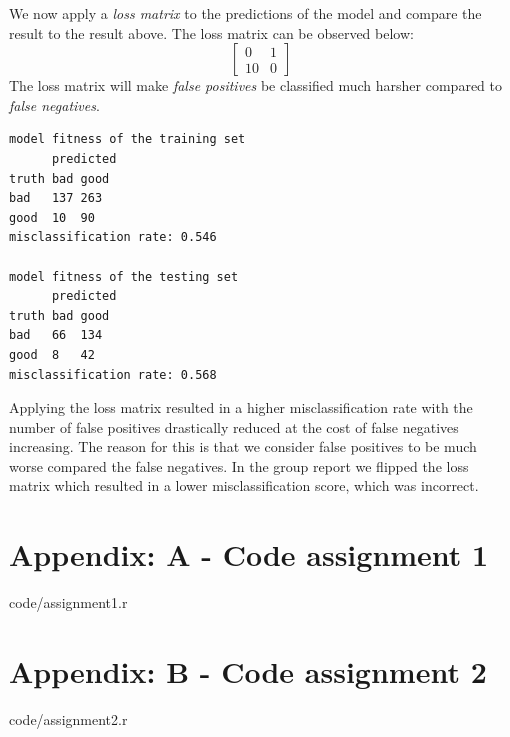 \documentclass[a4paper,12pt]{article}
\begin{document}
We now apply a \textit{loss matrix} to the predictions of the model and compare the result to the result above. The loss matrix can be observed below:
\begin{equation}
  \begin{bmatrix}
  0 & 1\\ 
  10 & 0
  \end{bmatrix}
\end{equation}
The loss matrix will make \textit{false positives} be classified much harsher compared to \textit{false negatives}.

\begin{verbatim}
model fitness of the training set
      predicted
truth bad good
bad   137 263
good  10  90
misclassification rate: 0.546

model fitness of the testing set
      predicted
truth bad good
bad   66  134
good  8   42
misclassification rate: 0.568
\end{verbatim}
Applying the loss matrix resulted in a higher misclassification rate with the number of false positives drastically reduced at the cost of false negatives increasing. The reason for this is that we consider false positives to be much worse compared the false negatives. In the group report we flipped the loss matrix which resulted in a lower misclassification score, which was incorrect.

\section{Appendix: A - Code assignment 1}


    {code/assignment1.r}

\section{Appendix: B - Code assignment 2}


    {code/assignment2.r}
\end{document}
